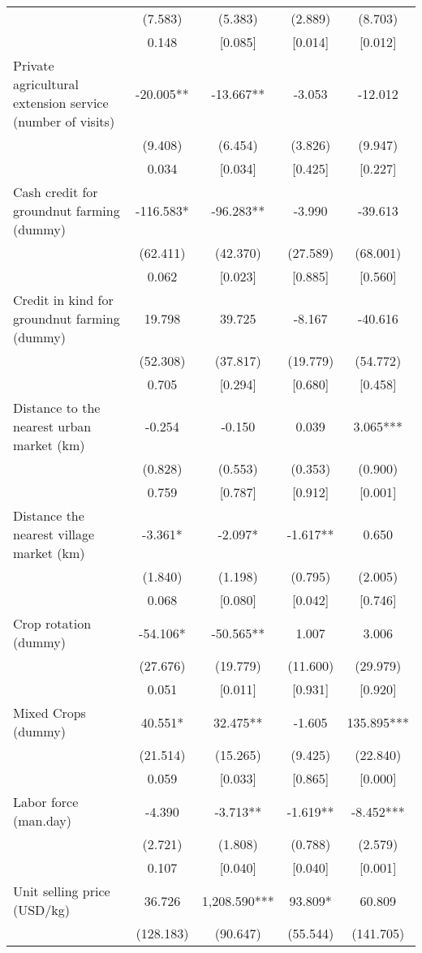 \documentclass[]{article}
\begin{document}
\begin{tabular}{lcccc}
 & (7.583) & (5.383) & (2.889) & (8.703) \\
 & 0.148 & [0.085] & [0.014] & [0.012] \\
Private agricultural extension service (number of visits) & -20.005** & -13.667** & -3.053 & -12.012 \\
 & (9.408) & (6.454) & (3.826) & (9.947) \\
 & 0.034 & [0.034] & [0.425] & [0.227] \\
Cash credit for groundnut farming (dummy) & -116.583* & -96.283** & -3.990 & -39.613 \\
 & (62.411) & (42.370) & (27.589) & (68.001) \\
 & 0.062 & [0.023] & [0.885] & [0.560] \\
Credit in kind for groundnut farming (dummy) & 19.798 & 39.725 & -8.167 & -40.616 \\
 & (52.308) & (37.817) & (19.779) & (54.772) \\
 & 0.705 & [0.294] & [0.680] & [0.458] \\
Distance to the nearest urban market (km) & -0.254 & -0.150 & 0.039 & 3.065*** \\
 & (0.828) & (0.553) & (0.353) & (0.900) \\
 & 0.759 & [0.787] & [0.912] & [0.001] \\
Distance the nearest village market (km) & -3.361* & -2.097* & -1.617** & 0.650 \\
 & (1.840) & (1.198) & (0.795) & (2.005) \\
 & 0.068 & [0.080] & [0.042] & [0.746] \\
Crop rotation (dummy) & -54.106* & -50.565** & 1.007 & 3.006 \\
 & (27.676) & (19.779) & (11.600) & (29.979) \\
 & 0.051 & [0.011] & [0.931] & [0.920] \\
Mixed Crops (dummy) & 40.551* & 32.475** & -1.605 & 135.895*** \\
 & (21.514) & (15.265) & (9.425) & (22.840) \\
 & 0.059 & [0.033] & [0.865] & [0.000] \\
Labor force (man.day) & -4.390 & -3.713** & -1.619** & -8.452*** \\
 & (2.721) & (1.808) & (0.788) & (2.579) \\
 & 0.107 & [0.040] & [0.040] & [0.001] \\
Unit selling price (USD/kg) & 36.726 & 1,208.590*** & 93.809* & 60.809 \\
 & (128.183) & (90.647) & (55.544) & (141.705) \\

\end{tabular}
\end{document}
